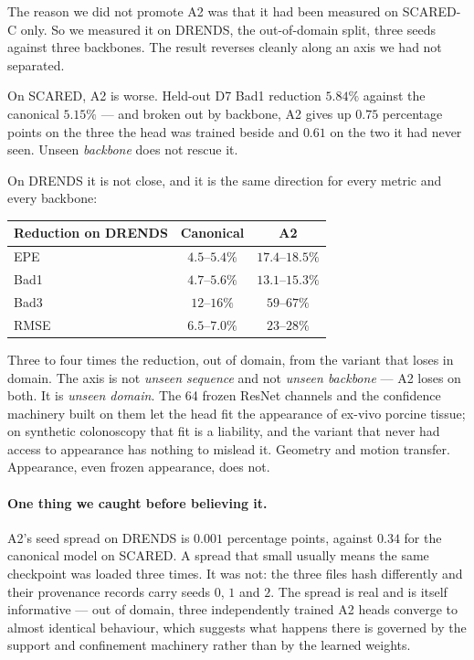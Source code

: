 \documentclass[11pt,a4paper]{article}
\begin{document}
The reason we did not promote A2 was that it had been measured on
SCARED-C only. So we measured it on DRENDS, the out-of-domain split,
three seeds against three backbones. The result reverses cleanly along an
axis we had not separated.

On SCARED, A2 is worse. Held-out D7 Bad1 reduction $5.84\%$ against the
canonical $5.15\%$ --- and broken out by backbone, A2 gives up
$0.75$ percentage points on the three the head was trained beside and
$0.61$ on the two it had never seen. Unseen \emph{backbone} does not
rescue it.

On DRENDS it is not close, and it is the same direction for every metric
and every backbone:

\begin{center}
\begin{tabular}{lcc}
\toprule
Reduction on DRENDS & Canonical & A2 \\
\midrule
EPE  & $4.5$--$5.4\%$  & $17.4$--$18.5\%$ \\
Bad1 & $4.7$--$5.6\%$  & $13.1$--$15.3\%$ \\
Bad3 & $12$--$16\%$    & $59$--$67\%$ \\
RMSE & $6.5$--$7.0\%$  & $23$--$28\%$ \\
\bottomrule
\end{tabular}
\end{center}

Three to four times the reduction, out of domain, from the variant that
loses in domain. The axis is not \emph{unseen sequence} and not
\emph{unseen backbone} --- A2 loses on both. It is \emph{unseen domain}.
The 64 frozen ResNet channels and the confidence machinery built on them
let the head fit the appearance of ex-vivo porcine tissue; on synthetic
colonoscopy that fit is a liability, and the variant that never had access
to appearance has nothing to mislead it. Geometry and motion transfer.
Appearance, even frozen appearance, does not.

\paragraph{One thing we caught before believing it.} A2's seed spread on
DRENDS is $0.001$ percentage points, against $0.34$ for the canonical
model on SCARED. A spread that small usually means the same checkpoint
was loaded three times. It was not: the three files hash differently and
their provenance records carry seeds $0$, $1$ and $2$. The spread is real
and is itself informative --- out of domain, three independently trained
A2 heads converge to almost identical behaviour, which suggests what
happens there is governed by the support and confinement machinery rather
than by the learned weights.
\end{document}

